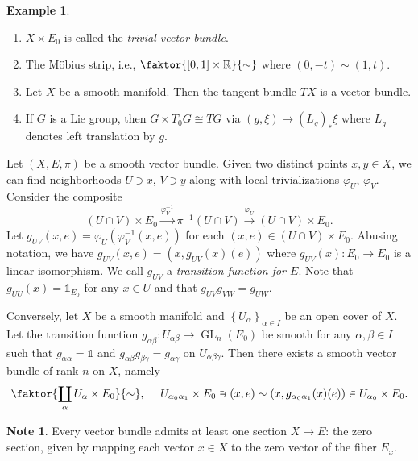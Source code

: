 \documentclass[10pt,letterpaper,cm]{nupset}
\theoremstyle{definition}
\newtheorem{exmp}[definition]{Example}
\newtheorem{note}[definition]{Note}
\theoremstyle{theorem}
\theoremstyle{remark}
\newcommand{\R}{\mathbb{R}}
\newcommand{\1}{\mathbb{1}}
\newcommand{\0}{\vec 0}
\DeclareMathOperator{\GL}{GL}
\begin{document}
\begin{exmp} $ $
\begin{enumerate}
\item $X \times E_0$ is called the \textit{trivial vector bundle}.
\item  The M\"obius strip, i.e., $\faktor{\left[0,1\right]\times \R}{\sim}$ where $\left(0, {-t}\right) \sim \left(1, t\right)$.
\item Let $X$ be a smooth manifold. Then the tangent bundle $T{X}$ is a vector bundle. 
\item If $G$ is a Lie group, then $ G \times T_0{G} \cong T{G}$ via $ (g, \xi) \mapsto \left(L_g\right)_{\ast}{\xi}$ where  $L_g$ denotes left translation by $g$. 
\end{enumerate}
\end{exmp}

\medskip

Let $\left(X, E, \pi\right)$ be a smooth vector bundle. Given two distinct points $x,y \in X$, we can find neighborhoods $U\ni x$, $V\ni y$ along with local trivializations $\varphi_U$, $\varphi_V$. Consider the composite $$ \left(U \cap V\right) \times E_0 \overset{\varphi^{-1}_V}{\longrightarrow} \pi^{-1}\left(U \cap V\right) \overset{\varphi_U}{\longrightarrow} \left(U \cap V\right) \times E_0    .$$ Let $g_{UV}(x,e) = \varphi_U(\varphi_V^{-1}(x,e))$ for each $\left(x,e\right) \in \left(U \cap V\right) \times E_0$. Abusing notation, we have $g_{UV}(x,e) = \left(x, g_{UV}(x)(e)\right)$ where $g_{UV}(x) : E_0 \to E_0$ is a linear isomorphism. We call $g_{UV}$ a \textit{transition function for $E$}. Note that $g_{UU}(x) = \1_{E_0}$ for any $x\in U$ and that $g_{UV}g_{VW} = g_{UW}$. 

\smallskip

Conversely,  let $X$ be a smooth manifold and $\left\{U_{\alpha}\right\}_{\alpha \in I}$ be an open cover of $X$. Let the transition function $g_{\alpha{\beta}} : U_{\alpha{\beta}} \to \GL_n(E_0)$ be smooth for any $\alpha, \beta \in I$ such that $g_{\alpha{\alpha}} = \1$ and $g_{\alpha{\beta}}g_{\beta{\gamma}} = g_{\alpha{\gamma}}$ on $U_{\alpha{\beta}{\gamma}}$.
 Then there exists a smooth vector bundle of rank $n$ on $X$, namely 
 \[
 \faktor{\coprod_{\alpha}{U_{\alpha} \times E_0}}{\sim}, \ \quad U_{\alpha_0{\alpha_1}} \times E_0 \ni (x,e) \sim \left(x, g_{\alpha_0{\alpha_1}}(x)(e)\right) \in U_{\alpha_0}\times E_0 .
 \]

\smallskip

\begin{note} 
 Every vector bundle admits at least one section $X\to E$: the zero section, given by mapping each vector $x \in X$ to the zero vector of the fiber $E_x$.
\end{note}
\end{document}

